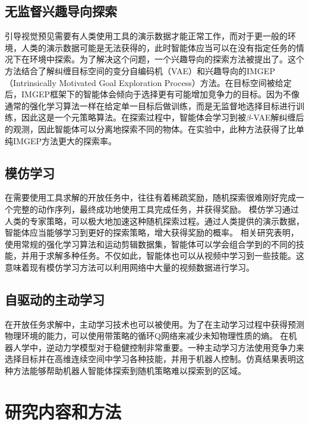         \subsection{无监督兴趣导向探索}
        引导视觉预见需要有人类使用工具的演示数据才能正常工作，而对于更一般的环境，人类的演示数据可能是无法获得的，此时智能体应当可以在没有指定任务的情况下在环境中探索。为了解决这个问题，一个兴趣导向的探索方法被提出了\cite{laversanne-finot2018curiosity}。这个方法结合了解纠缠目标空间的变分自编码机（VAE）和兴趣导向的IMGEP（Intrinsically Motivated Goal Exploration Process）方法\cite{DBLP:journals/corr/abs-1708-02190}。在目标空间被给定后，IMGEP框架下的智能体会倾向于选择更有可能增加竞争力的目标。因为不像通常的强化学习算法一样在给定单一目标后做训练，而是无监督地选择目标进行训练，因此这是一个元策略算法。在探索过程中，智能体会学习到被$\beta$-VAE解纠缠后的观测，因此智能体可以分离地探索不同的物体。在实验中，此种方法获得了比单纯IMGEP方法更大的探索率。

        \subsection{模仿学习}
        在需要使用工具求解的开放任务中，往往有着稀疏奖励，随机探索很难刚好完成一个完整的动作序列，最终成功地使用工具完成任务，并获得奖励。
        模仿学习通过人类的专家策略，可以极大地加速这种随机探索过程。通过人类提供的演示数据，智能体应当能够学习到更好的探索策略，增大获得奖励的概率。
        相关研究表明，使用常规的强化学习算法和运动剪辑数据集，智能体可以学会组合学到的不同的技能，并用于求解多种任务\cite{peng2018deepmimic}。不仅如此，智能体也可以从视频中学习到一些技能\cite{peng2019sfv}。这意味着现有模仿学习方法可以利用网络中大量的视频数据进行学习。

        \subsection{自驱动的主动学习}
        在开放任务求解中，主动学习技术也可以被使用。为了在主动学习过程中获得预测物理环境的能力，可以使用带策略的循环Q网络来减少未知物理性质的熵\cite{li2019active}。
        在机器人学中，逆动力学模型对于稳健控制非常重要。一种主动学习方法使用竞争力来选择目标并在高维连续空间中学习各种技能，并用于机器人控制\cite{baranes2013active}。仿真结果表明这种方法能够帮助机器人智能体探索到随机策略难以探索到的区域。

    \section{研究内容和方法}

